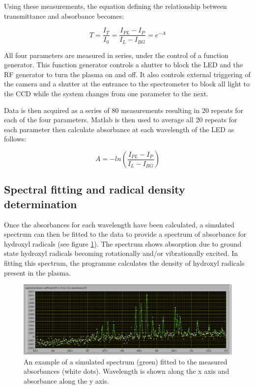 \documentclass[11pt, oneside]{article}   	%
\begin{document}
Using these measurements, the equation defining the relationship between transmittance and absorbance becomes:

\begin{equation} \label{eqn:4ParamTransmittance}
    T = \frac{I_T}{I_0} = \frac{I_{PL} - I_P}{I_L - I_{BG}} = e^{-A}
\end{equation}

All four parameters are measured in series, under the control of a function generator.
This function generator controls a shutter to block the LED and the RF generator to turn the plasma on and off. It also controls external triggering of the camera and a shutter at the entrance to the spectrometer to block all light to the CCD while the system changes from one parameter to the next. 

Data is then acquired as a series of 80 measurements resulting in 20 repeats for each of the four parameters.
Matlab is then used to average all 20 repeats for each parameter then calculate absorbance at each wavelength of the LED as follows:

\begin{equation}\label{eqn:Absorbance}
    A = -ln(\frac{I_{PL} - I_P}{I_L - I_{BG}})
\end{equation}

\subsection{Spectral fitting and radical density determination}

Once the absorbances for each wavelength have been calculated, a simulated spectrum can then be fitted to the data to provide a spectrum of absorbance for hydroxyl radicals (see figure \ref{fig:SpectrumFitting}). 
The spectrum shows absorption due to ground state hydroxyl radicals becoming rotationally and/or vibrationally excited.
In fitting this spectrum, the programme calculates the density of hydroxyl radicals present in the plasma.

\begin{figure}
    \centering
    \includegraphics[width=\textwidth]{Figures/SpectrumFitting.png}
    \caption{An example of a simulated spectrum (green) fitted to the measured absorbances (white dots). Wavelength is shown along the x axis and absorbance along the y axis.}
    \label{fig:SpectrumFitting}
\end{figure}
\end{document}
